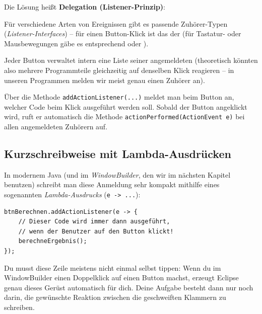 Die Lösung heißt \textbf{Delegation (Listener-Prinzip)}:
\begin{compactitem}
  \item Für verschiedene Arten von Ereignissen gibt es passende
  \glqq Zuhörer\grqq -Typen (\emph{Listener-Interfaces}) -- für einen
  Button-Klick ist das der  (für Tastatur- oder
  Mausbewegungen gäbe es entsprechend  oder
  ).
  \item Jeder Button verwaltet intern eine Liste seiner angemeldeten
   (theoretisch könnten also mehrere Programmteile
  gleichzeitig auf denselben Klick reagieren -- in unseren Programmen melden
  wir meist genau einen Zuhörer an).
  \item Über die Methode \lstinline|addActionListener(...)| meldet man beim
  Button an, welcher Code beim Klick ausgeführt werden soll. Sobald der Button
  angeklickt wird, ruft er automatisch die Methode \linebreak
  \lstinline|actionPerformed(ActionEvent e)| bei allen angemeldeten
  Zuhörern auf.
\end{compactitem}

\subsection{Kurzschreibweise mit Lambda-Ausdrücken}

In modernem Java (und im \emph{WindowBuilder}, den wir im nächsten Kapitel
benutzen) schreibt man diese Anmeldung sehr kompakt mithilfe eines sogenannten
\emph{Lambda-Ausdrucks} (\lstinline|e -> ...|):

\begin{lstlisting}
btnBerechnen.addActionListener(e -> {
    // Dieser Code wird immer dann ausgeführt,
    // wenn der Benutzer auf den Button klickt!
    berechneErgebnis();
});
\end{lstlisting}

Du musst diese Zeile meistens nicht einmal selbst tippen: Wenn du im
WindowBuilder einen Doppelklick auf einen Button machst, erzeugt Eclipse
genau dieses Gerüst automatisch für dich. Deine Aufgabe besteht dann nur noch
darin, die gewünschte Reaktion zwischen die geschweiften Klammern zu
schreiben.

